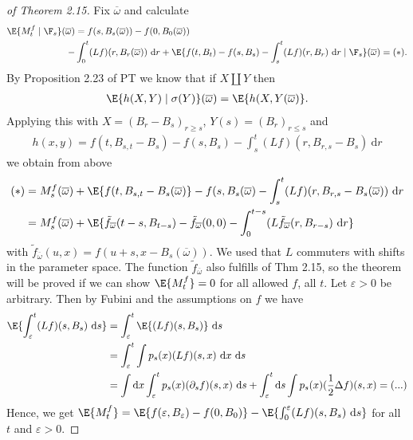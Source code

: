\begin{proof}[of Theorem 2.15]
Fix $\overline{\omega}$ and calculate
\begin{align*}
\E{M_t^f\mid \F_s}(\overline{\omega})&=f(s,B_s(\overline{\omega}))-f(0,B_0(\overline{\omega}))\\
-&\int_0^t (Lf)(r,B_r(\overline{\omega}))~\mathrm{d}r +\E{f(t,B_t)-f(s,B_s)-\int_s^t (Lf)(r,B_r)~\mathrm{d}r\mid \F_s}(\overline{\omega})=(\ast).
\end{align*}
By Proposition 2.23 of PT we know that if $X \amalg Y$ then
\begin{align*}
\E{h(X,Y)\mid \sigma(Y)}(\overline{\omega})=\E{h(X,Y(\overline{\omega})}.
\end{align*}
Applying this with $X=(B_r-B_s)_{r\geq s}$, $Y(s)=(B_r)_{r \leq s}$
and
\begin{align*}
h(x,y)=f(t,B_{s,t}-B_s)-f(s,B_s)-\int_s^t (Lf)(r,B_{r,s}-B_s)~\mathrm{d}r
\end{align*}
we obtain from above
\begin{align*}
(\ast)&=M_s^f(\overline{\omega})+\E{f(t,B_{s,t}-B_s(\overline{\omega})}-f(s,B_s(\overline{\omega})-\int_s^t (Lf)(r,B_{r,s}-B_s(\overline{\omega}))~\mathrm{d}r\\
&=M_s^f(\overline{\omega})+\E{\tilde{f}_{\overline{\omega}}(t-s,B_{t-s})-\tilde{f}_{\overline{\omega}}(0,0)-\int_0^{t-s} (L\tilde{f}_{\overline{\omega}}(r,B_{r-s})~\mathrm{d}r}
\end{align*}
with $\tilde{f}_{\overline{\omega}}(u,x)=f(u+s,x-B_s(\overline{\omega}))$.
We used that $L$ commuters with shifts in the parameter space.
The function $\tilde{f}_{\overline{\omega}}$ also fulfills of Thm 2.15, so the theorem will be proved if we can show $\E{M_t^f}=0$ for all allowed $f$, all $t$.
Let $\varepsilon>0$ be arbitrary. Then by Fubini and the assumptions on $f$ we have
\begin{align*}
\E{\int_\varepsilon^t(Lf)(s,B_s)~\mathrm{d}s}&=\int_\varepsilon^t \E{(Lf)(s,B_s)}~\mathrm{d}s\\
&=\int_\varepsilon^t \int p_s(x) (Lf)(s,x)~\mathrm{d}x~\mathrm{d}s\\
&=\int \mathrm{d}x \int_\varepsilon^t p_s(x)(\partial_s f)(s,x)~\mathrm{d}s+\int_\varepsilon^t \mathrm{d}s \int p_s(x)(\frac{1}{2}\Delta f)(s,x)= (...)
\end{align*}
Hence, we get $\E{M_t^f}=\E{f(\varepsilon,B_\varepsilon)-f(0,B_0)}-\E{\int_0^\varepsilon (Lf)(s,B_s)~\mathrm{d}s}$ for all $t$ and $\varepsilon>0$.
\end{proof}

